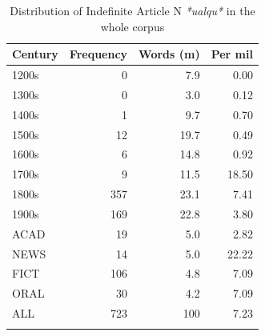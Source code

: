 \begin{table}
\begin{tabular}{lrrr}
\lsptoprule
Century &  Frequency &  Words (m) &  Per mil\\
  \midrule
  1200s& 0& 7.9& 0.00\\
  1300s& 0& 3.0& 0.12\\
  1400s& 1& 9.7& 0.70\\
  1500s& 12& 19.7& 0.49\\
  1600s& 6& 14.8& 0.92\\
  1700s& 9& 11.5& 18.50\\
  1800s& 357& 23.1& 7.41\\
  1900s& 169& 22.8& 3.80\\
  \tablevspace
  ACAD& 19& 5.0& 2.82\\
  NEWS& 14& 5.0& 22.22\\
  FICT& 106& 4.8& 7.09\\
  ORAL & 30    & 4.2  & 7.09 \\
  \midrule
  ALL& 723& 100& 7.23\\
  \lspbottomrule
\end{tabular}

\caption{Distribution of Indefinite Article N \textit{*ualqu*} in the whole corpus}
\label{tab:extracted7-2}
\end{table}

